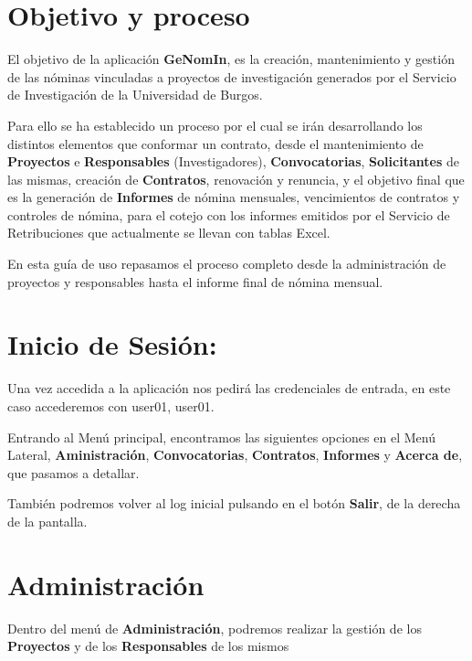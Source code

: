 \section{Objetivo y proceso}\label{objetivo-y-proceso}

El objetivo de la aplicación \textbf{GeNomIn}, es la creación, mantenimiento y gestión de las nóminas vinculadas a proyectos de investigación generados por el Servicio de Investigación de la Universidad de Burgos.

Para ello se ha establecido un proceso por el cual se irán desarrollando
los distintos elementos que conformar un contrato, desde el
mantenimiento de \textbf{Proyectos} e \textbf{Responsables}
(Investigadores), \textbf{Convocatorias}, \textbf{Solicitantes} de las
mismas, creación de \textbf{Contratos}, renovación y renuncia, y el
objetivo final que es la generación de \textbf{Informes} de nómina
mensuales, vencimientos de contratos y controles de nómina, para el
cotejo con los informes emitidos por el Servicio de Retribuciones que
actualmente se llevan con tablas Excel.

En esta guía de uso repasamos el proceso completo desde la
administración de proyectos y responsables hasta el informe final de
nómina mensual.

\section{Inicio de Sesión:}\label{inicio-de-sesion}
	
Una vez accedida a la aplicación nos pedirá las credenciales de entrada, en este caso accederemos con user01, user01.

Entrando al Menú principal, encontramos las siguientes opciones en el
Menú Lateral, \textbf{Aministración}, \textbf{Convocatorias},
\textbf{Contratos}, \textbf{Informes} y \textbf{Acerca de}, que pasamos a detallar.

También podremos volver al log inicial pulsando en el botón \textbf{Salir}, de la derecha de la pantalla.


\section{Administración}\label{administracion}

Dentro del menú de \textbf{Administración}, podremos realizar la gestión
de los \textbf{Proyectos} y de los \textbf{Responsables} de los mismos

